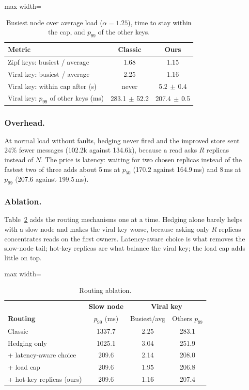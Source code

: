 \documentclass[sigconf,nonacm]{acmart}
\newcommand{\win}[1]{\textcolor{win}{#1}}
\newcommand{\pmsd}[2]{#1{\scriptsize$\,\pm\,$#2}}
\begin{document}
\begin{table}[h]
\caption{Busiest node over average load ($\alpha = 1.25$), time to stay within the cap, and $p_{99}$ of the other keys.}
\label{tab:load}
\small
\begin{adjustbox}{max width=\columnwidth}
\begin{tabular}{lcc}
\toprule
\textbf{Metric} & \textbf{Classic} & \textbf{Ours} \\
\midrule
Zipf keys: busiest / average & 1.68 & \win{1.15} \\
Viral key: busiest / average & 2.25 & \win{1.16} \\
Viral key: within cap after (s) & never & \win{\pmsd{5.2}{0.4}} \\
Viral key: $p_{99}$ of other keys (ms) & \pmsd{283.1}{52.2} & \win{\pmsd{207.4}{0.5}} \\
\bottomrule
\end{tabular}
\end{adjustbox}
\end{table}

\subsubsection{Overhead.} At normal load without faults, hedging never fired and the improved store sent 24\% fewer messages (102.2k against 134.6k), because a read asks $R$ replicas instead of $N$. The price is latency: waiting for two chosen replicas instead of the fastest two of three adds about 5\,ms at $p_{50}$ (170.2 against 164.9\,ms) and 8\,ms at $p_{99}$ (207.6 against 199.5\,ms).

\subsubsection{Ablation.} Table~\ref{tab:ablation-req} adds the routing mechanisms one at a time. Hedging alone barely helps with a slow node and makes the viral key worse, because asking only $R$ replicas concentrates reads on the first owners. Latency-aware choice is what removes the slow-node tail; hot-key replicas are what balance the viral key; the load cap adds little on top.

\begin{table}[h]
\caption{Routing ablation.}
\label{tab:ablation-req}
\small
\begin{adjustbox}{max width=\columnwidth}
\begin{tabular}{lccc}
\toprule
 & \textbf{Slow node} & \multicolumn{2}{c}{\textbf{Viral key}} \\
\textbf{Routing} & $p_{99}$ (ms) & Busiest/avg & Others $p_{99}$ \\
\midrule
Classic & 1337.7 & 2.25 & 283.1 \\
Hedging only & 1025.1 & 3.04 & 251.9 \\
+ latency-aware choice & 209.6 & 2.14 & 208.0 \\
+ load cap & 209.6 & 1.95 & 206.8 \\
+ hot-key replicas (ours) & 209.6 & 1.16 & 207.4 \\
\bottomrule
\end{tabular}
\end{adjustbox}
\end{table}
\end{document}
